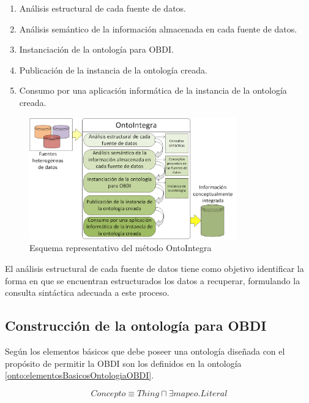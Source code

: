 \begin{enumerate}
\item Análisis estructural de cada fuente de datos.
\item Análisis semántico de la información almacenada en cada fuente de datos.
\item Instanciación de la ontología para OBDI.
\item Publicación de la instancia de la ontología creada.
\item Consumo por una aplicación informática de la instancia de la ontología creada.
\end{enumerate}

\begin{figure}
\begin{center}
	\includegraphics[width=0.8\textwidth]{img/Metodo_OntoIntegra.png}
\end{center}
\caption{Esquema representativo del método OntoIntegra}
\label{fig: metodoOntoIntegra}
\end{figure}

El análisis estructural de cada fuente de datos tiene como objetivo identificar la forma en que se encuentran estructurados los datos a recuperar, formulando la consulta sintáctica adecuada a este proceso.

\subsection{Construcción de la ontología para OBDI}

Según \cite{Calvanese2017} los elementos básicos que debe poseer una ontología diseñada con el propósito de permitir la OBDI son los definidos en la ontología \ref{onto:elementosBasicosOntologiaOBDI}.

\begin{equation}
Concepto \equiv Thing \sqcap \exists mapeo.Literal
\label{onto:elementosBasicosOntologiaOBDI}
\end{equation}





